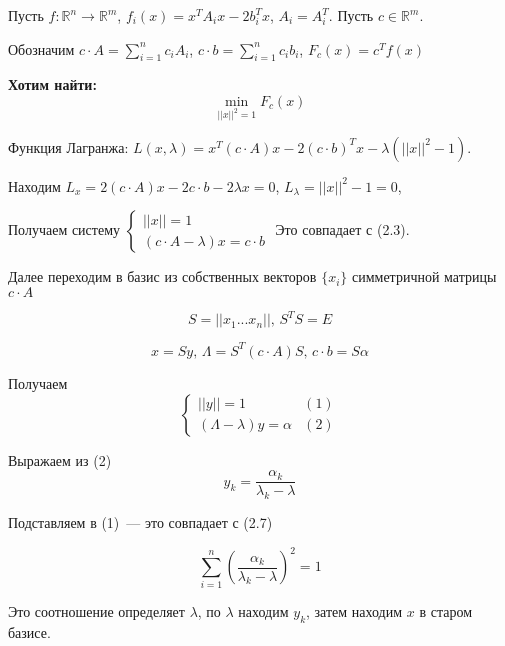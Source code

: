 \documentclass[a4paper]{article}
\date{\today}
\begin{document}
	
Пусть $f\colon \mathbb{R}^n\to\mathbb{R}^m$, $f_i(x)=x^TA_ix-2b_i^Tx$, $A_i=A_i^T$. Пусть $c\in\mathbb{R}^m$.

Обозначим $c\cdot  A=\sum\limits_{i=1}^n c_iA_i$, $c\cdot b=\sum\limits_{i=1}^n c_ib_i$, $F_c(x)=c^Tf(x)$

	{\bf Хотим найти:}
$$\min_{||x||^2=1}F_c(x)$$

Функция Лагранжа:
$L(x,\lambda)=x^T(c\cdot A)x-2(c\cdot b)^T x-\lambda(||x||^2-1)$.

Находим $L_x=2(c\cdot A)x-2c\cdot b-2\lambda x=0$, $L_\lambda=||x||^2-1=0$,

Получаем систему $\begin{cases}
||x||=1\\
(c\cdot A-\lambda)x=c\cdot b
\end{cases}$
Это совпадает с (2.3).

Далее переходим в базис из собственных векторов $\{x_i\}$ симметричной матрицы $c\cdot A$

$$S=||x_1...x_n||,\,S^TS=E$$

$$x=Sy,\,\Lambda=S^T(c\cdot A)S,\,c\cdot b=S\alpha$$

Получаем
$$\begin{cases}
||y||=1 &(1)\\
(\Lambda-\lambda)y=\alpha &(2)
\end{cases}
$$

Выражаем из (2) $$y_k=\frac{\alpha_k}{\lambda_k-\lambda}$$

Подставляем в (1)~--- это совпадает с (2.7)

$$\sum\limits_{i=1}^n (\frac{\alpha_k}{\lambda_k-\lambda})^2=1$$

Это соотношение определяет $\lambda$, по $\lambda$ находим $y_k$, затем находим $x$ в старом базисе.
\end{document}
